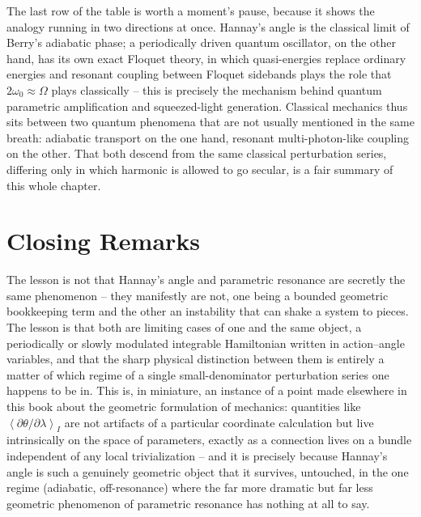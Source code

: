 \documentclass[11pt]{book}
\newcommand{\avg}[1]{\left\langle #1 \right\rangle}
\begin{document}
The last row of the table is worth a moment's pause, because it shows the analogy running in two
directions at once. Hannay's angle is the classical limit of Berry's adiabatic phase; a
periodically driven quantum oscillator, on the other hand, has its own exact Floquet theory, in
which quasi-energies replace ordinary energies and resonant coupling between Floquet sidebands
plays the role that $2\omega_0\approx\Omega$ plays classically -- this is precisely the mechanism
behind quantum parametric amplification and squeezed-light generation. Classical mechanics thus
sits between two quantum phenomena that are not usually mentioned in the same breath: adiabatic
transport on the one hand, resonant multi-photon-like coupling on the other. That both descend from
the same classical perturbation series, differing only in which harmonic is allowed to go secular,
is a fair summary of this whole chapter.

\section{Closing Remarks}

The lesson is not that Hannay's angle and parametric resonance are secretly the same phenomenon --
they manifestly are not, one being a bounded geometric bookkeeping term and the other an
instability that can shake a system to pieces. The lesson is that both are limiting cases of one
and the same object, a periodically or slowly modulated integrable Hamiltonian written in
action--angle variables, and that the sharp physical distinction between them is entirely a matter
of which regime of a single small-denominator perturbation series one happens to be in. This is, in
miniature, an instance of a point made elsewhere in this book about the geometric formulation of
mechanics: quantities like $\avg{\partial\theta/\partial\lambda}_I$ are not artifacts of a
particular coordinate calculation but live intrinsically on the space of parameters, exactly as a
connection lives on a bundle independent of any local trivialization -- and it is precisely because
Hannay's angle is such a genuinely geometric object that it survives, untouched, in the one regime
(adiabatic, off-resonance) where the far more dramatic but far less geometric phenomenon of
parametric resonance has nothing at all to say.
\end{document}
